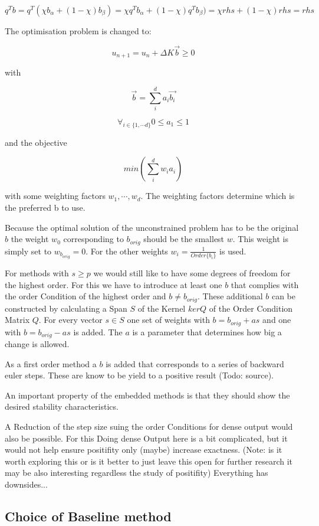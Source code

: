 \documentclass{article}
\begin{document}
$$ q^T b = q^T (\chi b_{\alpha} + (1-\chi) b_{\beta}) = \chi q^T  b_{\alpha} + (1-\chi) q^T  b_{\beta}) = \chi rhs + (1-\chi) rhs = rhs$$


The optimisation problem is changed to:

$$u_{n+1}=u_n+\Delta K \vec{b} \geq 0$$

with

$$ \vec{b} = \sum_i^d a_i \vec{b_i}$$

$$ \forall_{i \in \{1, \cdots d \}} 0 \leq a_1 \leq 1$$

and the objective

$$ min \left(\sum_i^d w_i a_i \right) $$

with some weighting factors $w_1,\cdots,w_d$. The weighting factors determine which is the preferred b to use.

Because the optimal solution of the unconstrained problem has to be the original $b$ the weight $w_0$ corresponding to $b_{orig}$ should be the smallest $w$. This weight is simply set to $w_{b_{orig}} = 0$. For the other weights $w_i = \frac{1}{Order\{b_i\}}$ is used.

For methods with $s \geq p$ we would still like to have some degrees of freedom for the highest order. For this we have to introduce at least one $b$ that complies with the order Condition of the highest order and $b \neq b_{orig}$.
These additional $b$ can be constructed by calculating a Span $S$ of the Kernel $ker Q$ of the Order Condition Matrix $Q$. For every vector $s \in S$ one set of weights with $b = b_{orig} + a s$ and one with $b = b_{orig} - a s$ is added. The $a$ is a parameter that determines how big a change is allowed. 

As a first order method a $b$ is added that corresponds to a series of backward euler steps. These are know to be yield to a positive result (Todo: source).

An important property of the embedded methods is that they should show the desired stability characteristics.

A Reduction of the step size suing the order Conditions for dense output would also be possible. For this 
Doing dense Output here is a bit complicated, but it would not help ensure positifity only (maybe) increase exactness. (Note: is it worth exploring this or is it better to just leave this open for further research it may be also interesting regardless the study of positifity)
Everything has downsides...
 


\subsection{Choice of Baseline method}
\end{document}
